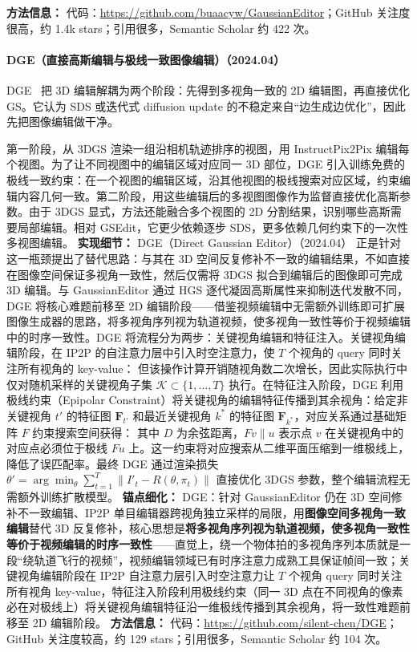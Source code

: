 \textbf{方法信息：} 代码：\url{https://github.com/buaacyw/GaussianEditor}；GitHub 关注度很高，约 1.4k stars；引用很多，Semantic Scholar 约 422 次。



\paragraph{DGE（直接高斯编辑与极线一致图像编辑）（2024.04）}
DGE~\cite{2404_18929} 把 3D 编辑解耦为两个阶段：先得到多视角一致的 2D 编辑图，再直接优化 GS。它认为 SDS 或迭代式 diffusion update 的不稳定来自“边生成边优化”，因此先把图像编辑做干净。

第一阶段，从 3DGS 渲染一组沿相机轨迹排序的视图，用 InstructPix2Pix 编辑每个视图。为了让不同视图中的编辑区域对应同一 3D 部位，DGE 引入训练免费的极线一致约束：在一个视图的编辑区域，沿其他视图的极线搜索对应区域，约束编辑内容几何一致。第二阶段，用这些编辑后的多视图图像作为监督直接优化高斯参数。由于 3DGS 显式，方法还能融合多个视图的 2D 分割结果，识别哪些高斯需要局部编辑。相对 GSEdit，它更少依赖逐步 SDS，更多依赖几何约束下的一次性多视图编辑。
\textbf{实现细节：} DGE（Direct Gaussian Editor）（2024.04） 正是针对这一瓶颈提出了替代思路：与其在 3D 空间反复修补不一致的编辑结果，不如直接在图像空间保证多视角一致性，然后仅需将 3DGS 拟合到编辑后的图像即可完成 3D 编辑。与 GaussianEditor 通过 HGS 逐代凝固高斯属性来抑制迭代发散不同，DGE 将核心难题前移至 2D 编辑阶段——借鉴视频编辑中无需额外训练即可扩展图像生成器的思路，将多视角序列视为轨道视频，使多视角一致性等价于视频编辑中的时序一致性。DGE 将流程分为两步：关键视角编辑和特征注入。关键视角编辑阶段，在 IP2P 的自注意力层中引入时空注意力，使 $T$ 个视角的 query 同时关注所有视角的 key-value： 但该操作计算开销随视角数二次增长，因此实际执行中仅对随机采样的关键视角子集 $\mathcal{K} \subset \{1, \ldots, T\}$ 执行。在特征注入阶段，DGE 利用极线约束（Epipolar Constraint）将关键视角的编辑特征传播到其余视角：给定非关键视角 $t'$ 的特征图 $\mathbf{F}_{t'}$ 和最近关键视角 $k^{*}$ 的特征图 $\mathbf{F}_{k^{*}}$，对应关系通过基础矩阵 $F$ 约束搜索空间获得： 其中 $D$ 为余弦距离，$Fv \parallel u$ 表示点 $v$ 在关键视角中的对应点必须位于极线 $Fu$ 上。这一约束将对应搜索从二维平面压缩到一维极线上，降低了误匹配率。最终 DGE 通过渲染损失 $\theta' = \arg\min_\theta \sum_{t=1}^{T} \| I'_t - R(\theta, \pi_t) \|$ 直接优化 3DGS 参数，整个编辑流程无需额外训练扩散模型。
\textbf{锚点细化：} DGE：针对 GaussianEditor 仍在 3D 空间修补不一致编辑、IP2P 单目编辑器跨视角独立采样的局限，用\textbf{图像空间多视角一致编辑}替代 3D 反复修补，核心思想是\textbf{将多视角序列视为轨道视频，使多视角一致性等价于视频编辑的时序一致性}——直觉上，绕一个物体拍的多视角序列本质就是一段``绕轨道飞行的视频''，视频编辑领域已有时序注意力成熟工具保证帧间一致；关键视角编辑阶段在 IP2P 自注意力层引入时空注意力让 $T$ 个视角 query 同时关注所有视角 key-value，特征注入阶段利用极线约束（同一 3D 点在不同视角的像素必在对极线上）将关键视角编辑特征沿一维极线传播到其余视角，将一致性难题前移至 2D 编辑阶段。
\textbf{方法信息：} 代码：\url{https://github.com/silent-chen/DGE}；GitHub 关注度较高，约 129 stars；引用很多，Semantic Scholar 约 104 次。



